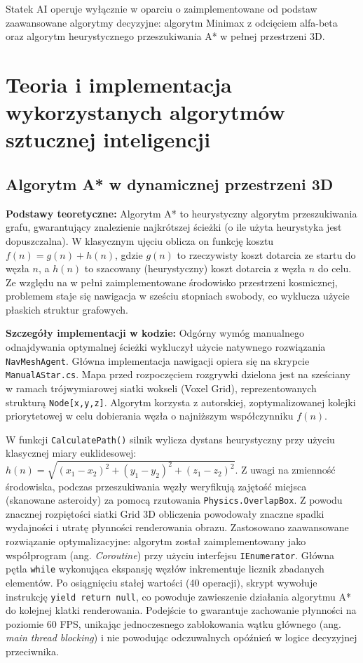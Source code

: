 \documentclass[12pt, a4paper]{article}
\begin{document}
Statek AI operuje wyłącznie w oparciu o zaimplementowane od podstaw zaawansowane algorytmy decyzyjne: algorytm Minimax z odcięciem alfa-beta oraz algorytm heurystycznego przeszukiwania A* w pełnej przestrzeni 3D. 


\section{Teoria i implementacja wykorzystanych algorytmów sztucznej inteligencji}

\subsection{Algorytm A* w dynamicznej przestrzeni 3D}
\textbf{Podstawy teoretyczne:} Algorytm A* to heurystyczny algorytm przeszukiwania grafu, gwarantujący znalezienie najkrótszej ścieżki (o ile użyta heurystyka jest dopuszczalna). W klasycznym ujęciu oblicza on funkcję kosztu $f(n) = g(n) + h(n)$, gdzie $g(n)$ to rzeczywisty koszt dotarcia ze startu do węzła $n$, a $h(n)$ to szacowany (heurystyczny) koszt dotarcia z węzła $n$ do celu. Ze względu na w pełni zaimplementowane środowisko przestrzeni kosmicznej, problemem staje się nawigacja w sześciu stopniach swobody, co wyklucza użycie płaskich struktur grafowych.

\textbf{Szczegóły implementacji w kodzie:} 
Odgórny wymóg manualnego odnajdywania optymalnej ścieżki wykluczył użycie natywnego rozwiązania \texttt{NavMeshAgent}. Główna implementacja nawigacji opiera się na skrypcie \texttt{ManualAStar.cs}. Mapa przed rozpoczęciem rozgrywki dzielona jest na sześciany w ramach trójwymiarowej siatki wokseli (Voxel Grid), reprezentowanych strukturą \texttt{Node[x,y,z]}. Algorytm korzysta z autorskiej, zoptymalizowanej kolejki priorytetowej w celu dobierania węzła o najniższym współczynniku $f(n)$.

W funkcji \texttt{CalculatePath()} silnik wylicza dystans heurystyczny przy użyciu klasycznej miary euklidesowej: $h(n) = \sqrt{(x_1 - x_2)^2 + (y_1 - y_2)^2 + (z_1 - z_2)^2}$. Z uwagi na zmienność środowiska, podczas przeszukiwania węzły weryfikują zajętość miejsca (skanowane asteroidy) za pomocą rzutowania \texttt{Physics.OverlapBox}.
Z powodu znacznej rozpiętości siatki Grid 3D obliczenia powodowały znaczne spadki wydajności i utratę płynności renderowania obrazu. Zastosowano zaawansowane rozwiązanie optymalizacyjne: algorytm został zaimplementowany jako współprogram (ang. \textit{Coroutine}) przy użyciu interfejsu \texttt{IEnumerator}. Główna pętla \texttt{while} wykonująca ekspansję węzłów inkrementuje licznik zbadanych elementów. Po osiągnięciu stałej wartości (40 operacji), skrypt wywołuje instrukcję \texttt{yield return null}, co powoduje zawieszenie działania algorytmu A* do kolejnej klatki renderowania. Podejście to gwarantuje zachowanie płynności na poziomie 60 FPS, unikając jednoczesnego zablokowania wątku głównego (ang. \textit{main thread blocking}) i nie powodując odczuwalnych opóźnień w logice decyzyjnej przeciwnika.
\end{document}
